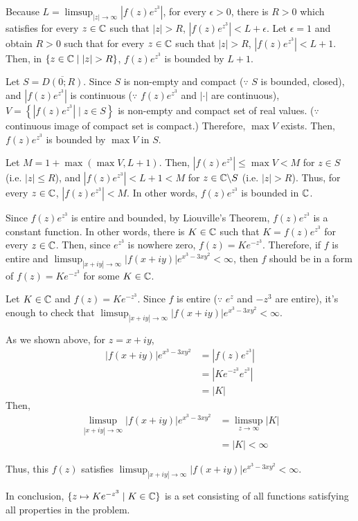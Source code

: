Because \(L = \limsup_{\left| z \right| \to \infty} \left| f(z) e^{z^3} \right| \),
for every \(\epsilon > 0\), there is \(R > 0\) which satisfies
for every \(z \in \mathbb{C}\) such that \(|z| > R\),
\(\left| f(z) e^{z^3} \right| < L + \epsilon\).
Let \(\epsilon = 1\) and obtain \(R > 0\) such that
for every \(z \in \mathbb{C}\) such that \(|z| > R\),
\(\left| f(z) e^{z^3} \right| < L + 1\).
Then, in \(\{z \in \mathbb{C} \mid |z| > R\}\), \(f(z) e^{z^3}\) is bounded by \(L + 1\).

Let \(S = \overline{D(0; R)}\).
Since \(S\) is non-empty and compact (\(\because\) \(S\) is bounded, closed),
and \(\left| f(z) e^{z^3} \right|\) is continuous
(\(\because\) \(f(z) e^{z^3}\) and \(\left| \cdot \right|\) are continuous),
\(V = \left\{ \left| f(z) e^{z^3} \right| \mid z \in S \right\}\) is non-empty and compact set of real values.
(\(\because\) continuous image of compact set is compact.)
Therefore, \(\max V\) exists.
Then, \(f(z) e^{z^3}\) is bounded by \(\max V\) in \(S\).

Let \(M = 1 + \max(\max V, L + 1)\).
Then, 
\(\left| f(z)e^{z^3} \right| \le \max V < M\)
for \(z \in S\) (i.e. \(|z| \le R\)),
and
\(\left| f(z)e^{z^3} \right| < L + 1 < M\)
for \(z \in \bbC \bs S\) (i.e. \(|z| > R\)).
Thus, for every \(z \in \mathbb{C}\), \(\left| f(z)e^{z^3} \right| < M\).
In other words, \(f(z)e^{z^3}\) is bounded in \(\mathbb{C}\).

Since \(f(z)e^{z^3}\) is entire and bounded,
by Liouville's Theorem,
\(f(z)e^{z^3}\) is a constant function.
In other words, there is \(K \in \mathbb{C}\) such that \(K = f(z) e^{z^3}\) for every \(z \in \mathbb{C}\).
Then, since \(e^{z^3}\) is nowhere zero,
\(f(z) = K e^{-z^3}\).
Therefore, if \(f\) is entire and \(\limsup_{|x+iy| \to \infty} \left| f(x + iy) \right| e^{x^3 - 3xy^2} < \infty\), then \(f\) should be in a form of \(f(z) = K e^{-z^3}\) for some \(K \in \mathbb{C}\).
\newline

Let \(K \in \mathbb{C}\) and \(f(z) = K e^{-z^3}\).
Since \(f\) is entire (\(\because\) \(e^z\) and \(-z^3\) are entire),
it's enough to check that \(\limsup_{|x+iy| \to \infty} \left| f(x + iy) \right| e^{x^3 - 3xy^2} < \infty\).

As we shown above, for \(z = x + iy\),
\begin{align*}
  \left| f(x + iy) \right| e^{x^3 - 3xy^2}
  &= \left| f(z) e^{z^3} \right|
  \\&= \left| Ke^{-z^3} e^{z^3} \right|
  \\&= \left| K \right|
\end{align*}
Then,
\begin{align*}
  \limsup_{|x + iy| \to \infty} \left| f(x + iy) \right| e^{x^3 - 3xy^2}
  &= \limsup_{z \to \infty} \left| K \right|
  \\&= |K|
  < \infty
\end{align*}

Thus, this \(f(z)\) satisfies \(\limsup_{|x + iy| \to \infty} \left| f(x + iy) \right| e^{x^3 - 3xy^2} < \infty\).
\newline

In conclusion,
\(\{z \mapsto K e^{-z^3} \mid K \in \mathbb{C}\}\)
is a set consisting of all functions
satisfying all properties in the problem.
\qedsq